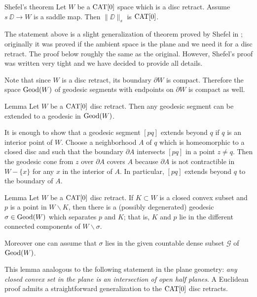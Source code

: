 \documentclass[a4paper,10pt]{amsart}
\begin{document}
 






\begin{thm}{Shefel's theorem}\label{thm:shefel-2D}
Let $W$ be a $\mathop{\rm CAT}\nolimits[0]$ space which is a disc retract.
Assume $s\:\DD\to W$ is a saddle map. 
Then $\|\DD\|_s$ is $\mathop{\rm CAT}\nolimits[0]$.
\end{thm}

The statement above is a slight generalization of theorem proved by Shefel in \cite{shefel-2D};
originally it was proved if the ambient space is the plane and we need it for a disc retract.
The proof below roughly the same as the original.
However, Shefel's proof was written very tight
and we have decided to provide all details.


Note that since $W$ is a disc retract, its boundary $\partial W$ is compact. Therefore
the space $\mathop{\rm Geod}\nolimits(W)$ of geodesic segments with endpoints on $\partial W$ is compact as well.

\begin{thm}{Lemma}\label{lem:extension}
Let $W$ be a $\mathop{\rm CAT}\nolimits[0]$  disc retract. Then any geodesic segment can be extended to a geodesic in $\mathop{\rm Geod}\nolimits(W)$.
\end{thm}

It is enough to show that a geodesic segment $[pq]$ extends beyond $q$ if $q$ is an interior point of $W$.
Choose a neighborhood $A$ of $q$ which is homeomorphic to a closed disc and such that the boundary $\partial A$
intersects $[pq]$ in a point $z\neq q$. Then the geodesic cone from $z$ over $\partial A$ covers $A$ because $\partial A$
is not contractible in $W-\{x\}$ for any $x$ in the interior of $A$. In particular, $[pq]$ extends beyond $q$ to the boundary of
$A$.
\qeds

\begin{thm}{Lemma}\label{lem:sepbygeo}
Let $W$ be a $\mathop{\rm CAT}\nolimits[0]$  disc retract. If $K\subset W$ is a closed convex subset and $p$ is a
point in $W\backslash K$, then there is a (possibly degenerated) geodesic $\sigma\in\mathop{\rm Geod}\nolimits(W)$ which separates $p$ and $K$;
that is, $K$ and $p$ lie in the different connected components of $W\backslash \sigma$.

Moreover one can assume that $\sigma$ lies in the given countable dense subset $\mathcal{G}$
of $\mathop{\rm Geod}\nolimits(W)$.
\end{thm}

This lemma analogous to the following statement in the plane geometry: \emph{any closed convex set in the plane is an intersection of open half planes}.
A Euclidean proof admits a straightforward generalization to the $\mathop{\rm CAT}\nolimits[0]$ disc retracts.
\end{document}
